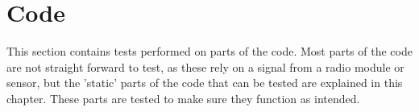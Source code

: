 \section{Code}
This section contains tests performed on parts of the code. Most parts of the code are not straight forward to test, as these rely on a signal from a radio module or sensor, but the 'static' parts of the code that can be tested are explained in this chapter. These parts are tested to make sure they function as intended.

 